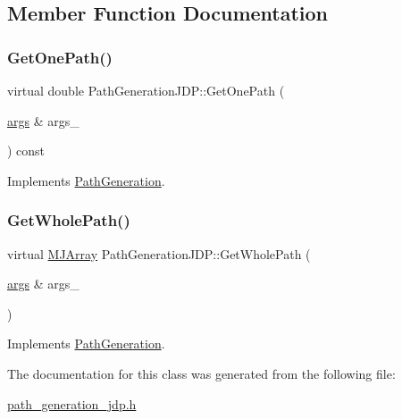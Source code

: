 \subsection{Member Function Documentation}
\hypertarget{classPathGenerationJDP_ad30abaeb2b4793a5fde77e9ce77e8691}{}\label{classPathGenerationJDP_ad30abaeb2b4793a5fde77e9ce77e8691} 
\subsubsection{\texorpdfstring{Get\+One\+Path()}{GetOnePath()}}
{\footnotesize\ttfamily virtual double Path\+Generation\+J\+D\+P\+::\+Get\+One\+Path (\begin{DoxyParamCaption}\item[{\hyperlink{path__generation_8h_a75c13cde2074f502cc4348c70528572d}{args} \&}]{args\+\_\+ }\end{DoxyParamCaption}) const\hspace{0.3cm}{\ttfamily [virtual]}}



Implements \hyperlink{classPathGeneration_a9a64a37f4dd9b2b3ef84f3cb66aed843}{Path\+Generation}.

\hypertarget{classPathGenerationJDP_a6bd084a32f7ad0a65039f1e77c1d428e}{}\label{classPathGenerationJDP_a6bd084a32f7ad0a65039f1e77c1d428e} 
\subsubsection{\texorpdfstring{Get\+Whole\+Path()}{GetWholePath()}}
{\footnotesize\ttfamily virtual \hyperlink{classMJArray}{M\+J\+Array} Path\+Generation\+J\+D\+P\+::\+Get\+Whole\+Path (\begin{DoxyParamCaption}\item[{\hyperlink{path__generation_8h_a75c13cde2074f502cc4348c70528572d}{args} \&}]{args\+\_\+ }\end{DoxyParamCaption})\hspace{0.3cm}{\ttfamily [virtual]}}



Implements \hyperlink{classPathGeneration_ace7520fed7b6a7711f4d3684c974cb76}{Path\+Generation}.



The documentation for this class was generated from the following file\+:\begin{DoxyCompactItemize}
\item 
\hyperlink{path__generation__jdp_8h}{path\+\_\+generation\+\_\+jdp.\+h}\end{DoxyCompactItemize}
